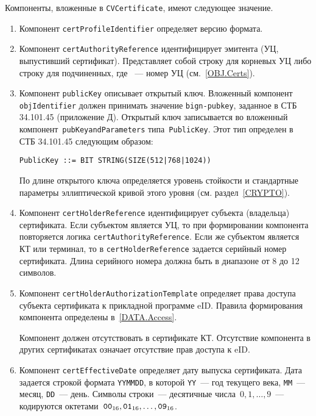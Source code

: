 Компоненты, вложенные в \verb|CVCertificate|, имеют следующее значение.
\begin{enumerate}
\item
Компонент \verb|certProfileIdentifier| определяет версию формата. 

\item
Компонент \verb|certAuthorityReference| идентифицирует эмитента 
(УЦ, выпустивший сертификат). 
%
Представляет собой строку  для корневых УЦ либо  
строку  для подчиненных, где ~--- 
номер УЦ (см.~\ref{OBJ.Certs}).

\item
Компонент \verb|publicKey| описывает открытый ключ.
%
Вложенный компонент \verb|objIdentifier| 
должен принимать значение \texttt{bign-pubkey}, 
заданное в СТБ 34.101.45 (приложение Д).
%
Открытый ключ записывается во вложенный компонент~\verb|pubKeyandParameters| 
типа~\verb|PublicKey|. Этот тип определен в СТБ 34.101.45 следующим образом: 
\begin{verbatim} 
PublicKey ::= BIT STRING(SIZE(512|768|1024))
\end{verbatim} 

По длине открытого ключа определяется уровень стойкости и стандартные параметры  
эллиптической кривой этого уровня (см. раздел~\ref{CRYPTO}).

\item
Компонент \verb|certHolderReference| идентифицирует субъекта (владельца) 
сертификата. Если субъектом является УЦ, то при формировании компонента 
повторяется логика \verb|certAuthorityReference|. 
%
Если же субъектом является КТ или терминал, то в \verb|certHolderReference|
задается серийный номер сертификата. Длина серийного номера должна быть в 
диапазоне от 8 до 12 символов. 

\item
Компонент \verb|certHolderAuthorizationTemplate| определяет права доступа 
субъекта сертификата к прикладной программе eID. Правила формирования 
компонента определены в~\ref{DATA.Access}.

Компонент должен отсутствовать в сертификате КТ.
%
Отсутствие компонента в других сертификатах означает отсутствие прав 
доступа к eID. 

\item
Компонент \verb|certEffectiveDate| определяет дату выпуска сертификата.
%
Дата задается строкой формата \texttt{YYMMDD}, 
в которой \texttt{YY}~--- год текущего века, 
\texttt{MM}~--- месяц, \texttt{DD}~--- день.
%
Символы строки~--- десятичные числа~$0,1,\ldots,9$~---
кодируются октетами~$\texttt{00}_{16},\texttt{01}_{16},\ldots,\texttt{09}_{16}$.


\end{enumerate}
